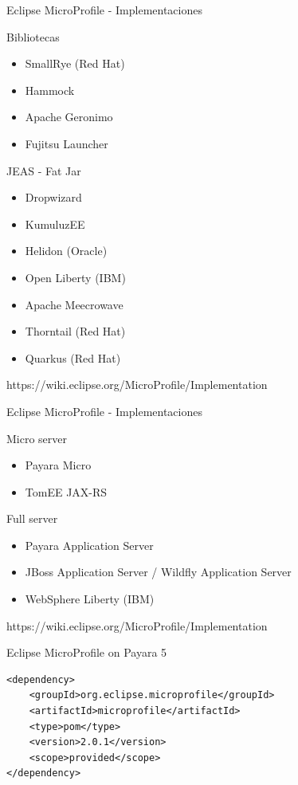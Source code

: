 \documentclass{beamer}
\begin{document}
\begin{frame}{Eclipse MicroProfile - Implementaciones}

Bibliotecas
\begin{itemize}
	\item SmallRye (Red Hat)
	\item Hammock
	\item Apache Geronimo
	\item Fujitsu Launcher
\end{itemize}
	
JEAS - Fat Jar
\begin{itemize}
	\item Dropwizard
	\item KumuluzEE
	\item Helidon (Oracle)
	\item Open Liberty (IBM)
	\item Apache Meecrowave
	\item Thorntail (Red Hat)
	\item Quarkus (Red Hat)
\end{itemize}

https://wiki.eclipse.org/MicroProfile/Implementation

\end{frame}
\begin{frame}{Eclipse MicroProfile - Implementaciones}

Micro server
\begin{itemize}
	\item Payara Micro
	\item TomEE JAX-RS
\end{itemize}

Full server
\begin{itemize}
	\item Payara Application Server
	\item JBoss Application Server / Wildfly Application Server
	\item WebSphere Liberty (IBM)
\end{itemize}

https://wiki.eclipse.org/MicroProfile/Implementation
\end{frame}

\begin{frame}[fragile]{Eclipse MicroProfile on Payara 5}
\begin{lstlisting}
<dependency>
	<groupId>org.eclipse.microprofile</groupId>
	<artifactId>microprofile</artifactId>
	<type>pom</type>
	<version>2.0.1</version>
	<scope>provided</scope>
</dependency>
\end{lstlisting}
\end{frame}
\end{document}
